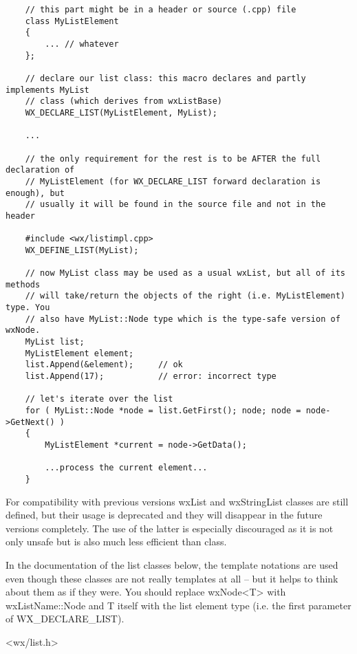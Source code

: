 \begin{verbatim}
    // this part might be in a header or source (.cpp) file
    class MyListElement
    {
        ... // whatever
    };

    // declare our list class: this macro declares and partly implements MyList
    // class (which derives from wxListBase)
    WX_DECLARE_LIST(MyListElement, MyList);

    ...

    // the only requirement for the rest is to be AFTER the full declaration of
    // MyListElement (for WX_DECLARE_LIST forward declaration is enough), but
    // usually it will be found in the source file and not in the header

    #include <wx/listimpl.cpp>
    WX_DEFINE_LIST(MyList);

    // now MyList class may be used as a usual wxList, but all of its methods
    // will take/return the objects of the right (i.e. MyListElement) type. You
    // also have MyList::Node type which is the type-safe version of wxNode.
    MyList list;
    MyListElement element;
    list.Append(&element);     // ok
    list.Append(17);           // error: incorrect type

    // let's iterate over the list
    for ( MyList::Node *node = list.GetFirst(); node; node = node->GetNext() )
    {
        MyListElement *current = node->GetData();

        ...process the current element...
    }
\end{verbatim}

For compatibility with previous versions wxList and wxStringList classes are
still defined, but their usage is deprecated and they will disappear in the
future versions completely. The use of the latter is especially discouraged as
it is not only unsafe but is also much less efficient than
 class.

In the documentation of the list classes below, the template notations are
used even though these classes are not really templates at all -- but it helps
to think about them as if they were. You should replace wxNode<T> with
wxListName::Node and T itself with the list element type (i.e. the first
parameter of WX\_DECLARE\_LIST).




<wx/list.h>

